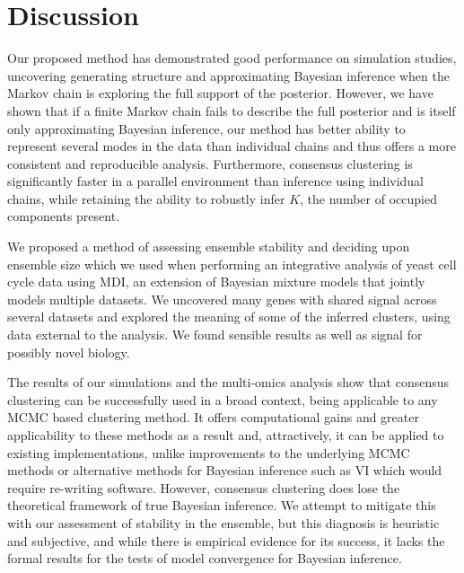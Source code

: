 \documentclass{bioinfo}
\begin{document}
\section{Discussion}
Our proposed method has demonstrated good performance on simulation studies, uncovering generating structure and approximating Bayesian inference when the Markov chain is exploring the full support of the posterior. However, we have shown that if a finite Markov chain fails to describe the full posterior and is itself only approximating Bayesian inference, our method has better ability to represent several modes in the data than individual chains and thus offers a more consistent and reproducible analysis. Furthermore, consensus clustering is significantly faster in a parallel environment than inference using individual chains, while retaining the ability to robustly infer $K$, the number of occupied components present. 

We proposed a method of assessing ensemble stability and deciding upon ensemble size which we used when performing an integrative analysis of yeast cell cycle data using MDI, an extension of Bayesian mixture models that jointly models multiple datasets. 
We uncovered many genes with shared signal across several datasets and explored the meaning of some of the inferred clusters, using data external to the analysis. We found sensible results as well as signal for possibly novel biology. 

The results of our simulations and the multi-omics analysis show that consensus clustering can be successfully used in a broad context, being applicable to any MCMC based clustering method. It offers computational gains and greater applicability to these methods as a result and, attractively, it can be applied to existing implementations, unlike improvements to the underlying MCMC methods or alternative methods for Bayesian inference such as VI which would require re-writing software. However, consensus clustering does lose the theoretical framework of true Bayesian inference. We attempt to mitigate this with our assessment of stability in the ensemble, but this diagnosis is heuristic and subjective, and while there is empirical evidence for its success, it lacks the formal results for the tests of model convergence for Bayesian inference.
\end{document}
